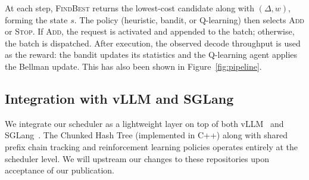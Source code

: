 At each step, \textsc{FindBest} returns the lowest-cost candidate along with $(\Delta, w)$, forming the state $s$. The policy (heuristic, bandit, or Q-learning) then selects \textsc{Add} or \textsc{Stop}. If \textsc{Add}, the request is activated and appended to the batch; otherwise, the batch is dispatched. After execution, the observed decode throughput is used as the reward: the bandit updates its statistics and the Q-learning agent applies the Bellman update. This has also been shown in Figure~\ref{fig:pipeline}. 

\vspace{-7pt}

\subsection{Integration with vLLM and SGLang}
We integrate our scheduler as a lightweight layer on top of both vLLM~\cite{kwon2023efficient} and SGLang~\cite{zheng2024sglangefficientexecutionstructured}. The Chunked Hash Tree (implemented in C++) along with shared prefix chain tracking and reinforcement learning policies operates entirely at the scheduler level. We will upstream our changes to these repositories upon acceptance of our publication.

\vspace{-3pt}